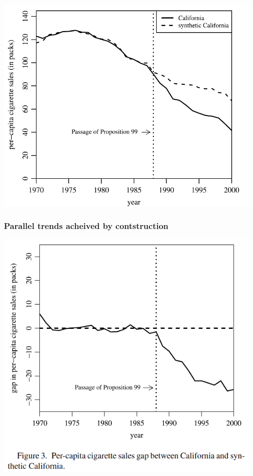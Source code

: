\begin{frame}
  \frametitle{}
  \begin{center}
    \includegraphics[width=.9\textwidth]{./resources/ADHCAsynth}
  \end{center}  
\end{frame}

\begin{frame}
  \frametitle{Parallel trends acheived by contstruction}
  \vspace{-10pt}
  \begin{center}
    \includegraphics[width=.9\textwidth]{./resources/ADHSdifftrends}
  \end{center}  
\end{frame}

